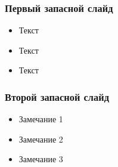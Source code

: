 \begin{frame}
  \frametitle{Первый запасной слайд}
  \begin{itemize}
    \item Текст
    \item Текст
    \item Текст
  \end{itemize}
\end{frame}

\begin{frame}
  \frametitle{Второй запасной слайд}
  \begin{itemize}
    \item Замечание 1
    \item Замечание 2
    \item Замечание 3
  \end{itemize}
\end{frame}
